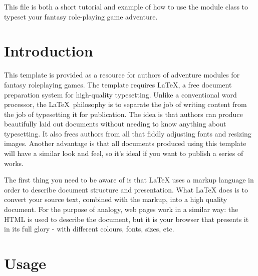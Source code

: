 \documentclass[a4paper,serif]{module}
\begin{document}

\maketitle







\showtitle

This file is both a short tutorial and example of how to use the module class to typeset your fantasy role-playing game adventure.

\part{Introduction}

This template is provided as a resource for authors of adventure modules for fantasy roleplaying games.
The template requires \LaTeX, a free document preparation system for high-quality typesetting. Unlike a conventional
word processor, the \LaTeX~philosophy is to separate the job of writing content from the job of typesetting it for
publication. The idea is that authors can produce beautifully laid out documents without needing to know anything
about typesetting. It also frees authors from all that fiddly adjusting fonts and resizing images. Another advantage
is that all documents produced using this template will have a similar look and feel, so it's ideal if you want to
publish a series of works.

The first thing you need to be aware of is that LaTeX uses a markup language in order to describe document structure and presentation. What LaTeX does is to convert your source text, combined with the markup, into a high quality document. For the purpose of analogy, web pages work in a similar way: the HTML is used to describe the document, but it is your browser that presents it in its full glory - with different colours, fonts, sizes, etc.

\part{Usage}
\end{document}
